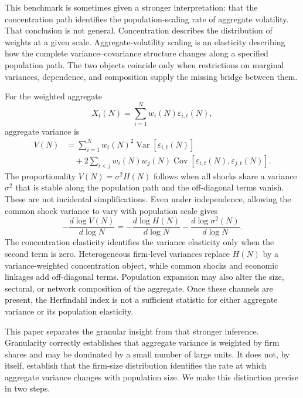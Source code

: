 \documentclass[a4paper,fleqn]{cas-dc}
\begin{document}
This benchmark is sometimes given a stronger interpretation: that the
concentration path identifies the population-scaling rate of aggregate
volatility. That conclusion is not general. Concentration describes the
distribution of weights at a given scale. Aggregate-volatility scaling
is an elasticity describing how the complete variance--covariance
structure changes along a specified population path. The two objects
coincide only when restrictions on marginal variances, dependence, and
composition supply the missing bridge between them.

For the weighted aggregate
\begin{equation}
    X_t(N)=\sum_{i=1}^{N}w_i(N)\varepsilon_{i,t}(N),
\end{equation}
aggregate variance is
\begin{align}
\label{eq:intro_variance}
    V(N)
    &=
    \sum_{i=1}^{N}w_i(N)^2
    \operatorname{Var}\!\left[\varepsilon_{i,t}(N)\right]
    \nonumber\\
    &\quad+
    2\sum_{i<j}w_i(N)w_j(N)
    \operatorname{Cov}\!\left[
        \varepsilon_{i,t}(N),\varepsilon_{j,t}(N)
    \right].
\end{align}
The proportionality $V(N)=\sigma^2H(N)$ follows when all shocks share a
variance $\sigma^2$ that is stable along the population path and the
off-diagonal terms vanish. These are not incidental simplifications.
Even under independence, allowing the common shock variance to vary with
population scale gives
\begin{equation}
\label{eq:benchmark_elasticity_bridge}
    -\frac{d\log V(N)}{d\log N}
    =
    -\frac{d\log H(N)}{d\log N}
    -\frac{d\log \sigma^2(N)}{d\log N}.
\end{equation}
The concentration elasticity identifies the variance elasticity only
when the second term is zero. Heterogeneous firm-level variances replace
$H(N)$ by a variance-weighted concentration object, while common shocks
and economic linkages add off-diagonal terms. Population expansion may
also alter the size, sectoral, or network composition of the aggregate.
Once these channels are present, the Herfindahl index is not a sufficient
statistic for either aggregate variance or its population elasticity.

This paper separates the granular insight from that stronger inference.
Granularity correctly establishes that aggregate variance is weighted
by firm shares and may be dominated by a small number of large units. It
does not, by itself, establish that the firm-size distribution identifies
the rate at which aggregate variance changes with population size. We
make this distinction precise in two steps.
\end{document}
